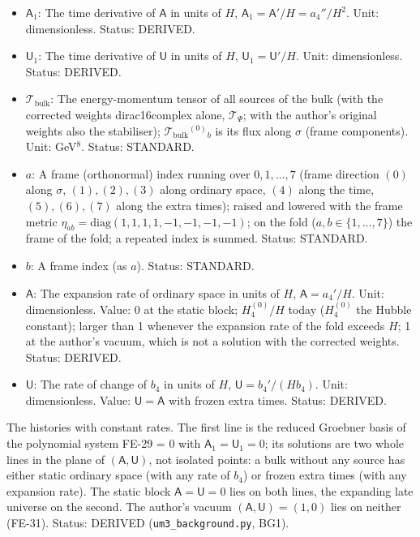 \documentclass[
  10pt,
]{article}
\providecommand{\tightlist}{%
  \setlength{\itemsep}{0pt}\setlength{\parskip}{0pt}}
\begin{document}
\begin{itemize}
\tightlist
\item
  \(\mathsf{A}_1\): The time derivative of \(\mathsf{A}\) in units of
  \(H\), \(\mathsf{A}_1 = \mathsf{A}'/H = a_4''/H^2\). Unit:
  dimensionless. Status: DERIVED.
\item
  \(\mathsf{U}_1\): The time derivative of \(\mathsf{U}\) in units of
  \(H\), \(\mathsf{U}_1 = \mathsf{U}'/H\). Unit: dimensionless. Status:
  DERIVED.
\item
  \(\mathcal{T}_{\mathrm{bulk}}\): The energy-momentum tensor of all
  sources of the bulk (with the corrected weights dirac16complex alone,
  \(\mathcal{T}_\Psi\); with the author's original weights also the
  stabiliser); \(\mathcal{T}_{\mathrm{bulk}}{}^{(0)}{}_b\) is its flux
  along \(\sigma\) (frame components). Unit: GeV\(^8\). Status:
  STANDARD.
\item
  \(a\): A frame (orthonormal) index running over \(0, 1, \dots, 7\)
  (frame direction \((0)\) along \(\sigma\), \((1), (2), (3)\) along
  ordinary space, \((4)\) along the time, \((5), (6), (7)\) along the
  extra times); raised and lowered with the frame metric
  \(\eta_{ab} = \mathrm{diag}(1, 1, 1, 1, -1, -1, -1, -1)\); on the fold
  (\(a, b \in \{1, \dots, 7\}\)) the frame of the fold; a repeated index
  is summed. Status: STANDARD.
\item
  \(b\): A frame index (as \(a\)). Status: STANDARD.
\item
  \(\mathsf{A}\): The expansion rate of ordinary space in units of
  \(H\), \(\mathsf{A} = a_4'/H\). Unit: dimensionless. Value: 0 at the
  static block; \(H_4^{(0)}/H\) today (\(H_4^{(0)}\) the Hubble
  constant); larger than 1 whenever the expansion rate of the fold
  exceeds \(H\); 1 at the author's vacuum, which is not a solution with
  the corrected weights. Status: DERIVED.
\item
  \(\mathsf{U}\): The rate of change of \(b_4\) in units of \(H\),
  \(\mathsf{U} = b_4'/(Hb_4)\). Unit: dimensionless. Value:
  \(\mathsf{U} = \mathsf{A}\) with frozen extra times. Status: DERIVED.
\end{itemize}

The histories with constant rates. The first line is the reduced
Groebner basis of the polynomial system FE-29 = 0 with
\(\mathsf{A}_1 = \mathsf{U}_1 = 0\); its solutions are two whole lines
in the plane of \((\mathsf{A}, \mathsf{U})\), not isolated points: a
bulk without any source has either static ordinary space (with any rate
of \(b_4\)) or frozen extra times (with any expansion rate). The static
block \(\mathsf{A} = \mathsf{U} = 0\) lies on both lines, the expanding
late universe on the second. The author's vacuum
\((\mathsf{A}, \mathsf{U}) = (1, 0)\) lies on neither (FE-31). Status:
DERIVED (\texttt{um3\_background.py}, BG1).
\end{document}
